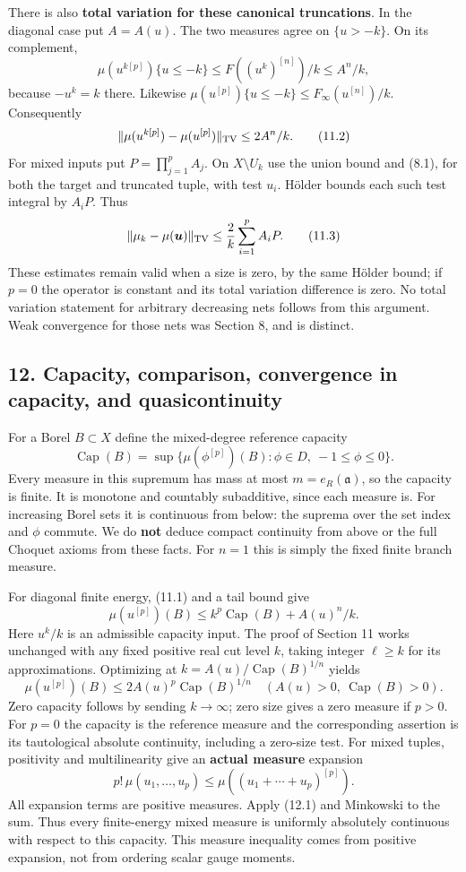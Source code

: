 \documentclass[
]{article}
\begin{document}
There is also \textbf{total variation for these canonical truncations}.
In the diagonal case put \(A=A(u)\). The two measures agree on
\(\{u>-k\}\). On its complement,
\[\mu(u^{k[p]})\{u\le-k\}\le F((u^k)^{[n]})/k\le A^n/k,\] because
\(-u^k=k\) there. Likewise
\(\mu(u^{[p]})\{u\le-k\}\le F_\infty(u^{[n]})/k\). Consequently
\[\|\mu(u^{k[p]})-\mu(u^{[p]})\|_{\rm TV}\le2A^n/k.\tag{11.2}\] For
mixed inputs put \(P=\prod_{j=1}^p A_j\). On \(X\setminus U_k\) use the
union bound and (8.1), for both the target and truncated tuple, with
test \(u_i\). Hölder bounds each such test integral by \(A_iP\). Thus
\[\|\mu_k-\mu(\boldsymbol u)\|_{\rm TV}\le\frac2k\sum_{i=1}^p A_iP.\tag{11.3}\]
These estimates remain valid when a size is zero, by the same Hölder
bound; if \(p=0\) the operator is constant and its total variation
difference is zero. No total variation statement for arbitrary
decreasing nets follows from this argument. Weak convergence for those
nets was Section 8, and is distinct.

\subsection{12. Capacity, comparison, convergence in capacity, and
quasicontinuity}\label{capacity-comparison-convergence-in-capacity-and-quasicontinuity}

For a Borel \(B\subset X\) define the mixed-degree reference capacity
\[\operatorname{Cap}(B)=\sup\{\mu(\phi^{[p]})(B):\phi\in D,\ -1\le\phi\le0\}.\]
Every measure in this supremum has mass at most \(m=e_R(\mathfrak a)\),
so the capacity is finite. It is monotone and countably subadditive,
since each measure is. For increasing Borel sets it is continuous from
below: the suprema over the set index and \(\phi\) commute. We do
\textbf{not} deduce compact continuity from above or the full Choquet
axioms from these facts. For \(n=1\) this is simply the fixed finite
branch measure.

For diagonal finite energy, (11.1) and a tail bound give
\[\mu(u^{[p]})(B)\le k^p\operatorname{Cap}(B)+A(u)^n/k.\] Here \(u^k/k\)
is an admissible capacity input. The proof of Section 11 works unchanged
with any fixed positive real cut level \(k\), taking integer
\(\ell\ge k\) for its approximations. Optimizing at
\(k=A(u)/\operatorname{Cap}(B)^{1/n}\) yields
\[\mu(u^{[p]})(B)\le2A(u)^p\operatorname{Cap}(B)^{1/n}\quad(A(u)>0,\ \operatorname{Cap}(B)>0).\tag{12.1}\]
Zero capacity follows by sending \(k\to\infty\); zero size gives a zero
measure if \(p>0\). For \(p=0\) the capacity is the reference measure
and the corresponding assertion is its tautological absolute continuity,
including a zero-size test. For mixed tuples, positivity and
multilinearity give an \textbf{actual measure} expansion
\[p!\,\mu(u_1,\ldots,u_p)\le\mu((u_1+\cdots+u_p)^{[p]}).\] All expansion
terms are positive measures. Apply (12.1) and Minkowski to the sum. Thus
every finite-energy mixed measure is uniformly absolutely continuous
with respect to this capacity. This measure inequality comes from
positive expansion, not from ordering scalar gauge moments.
\end{document}
